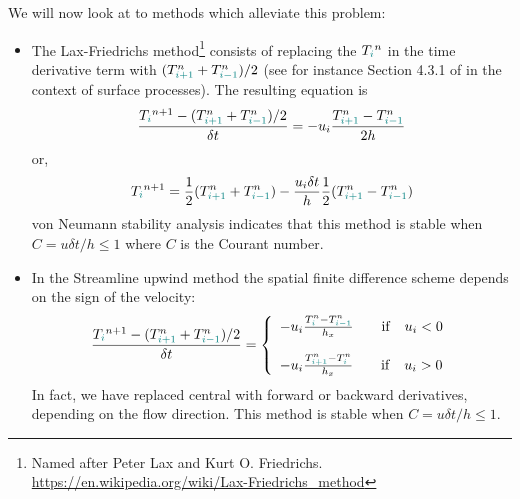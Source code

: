 We will now look at to methods which alleviate this problem:

\begin{itemize}
\item The {\color{olive} Lax-Friedrichs method}\footnote{Named after Peter Lax 
and Kurt O. Friedrichs. \url{https://en.wikipedia.org/wiki/Lax-Friedrichs_method}} consists of replacing the $T_{\color{teal}i}^n$ 
in the time derivative term with $(T_{{\color{teal}i+1}}^n + T_{{\color{teal}i-1}}^n)/2$
(see for instance Section 4.3.1 of \cite{pell08} in the context of surface processes). 
The resulting equation is
\[
\frac{T_{\color{teal}i}^{n+1}-  (T_{{\color{teal}i+1}}^n + T_{{\color{teal}i-1}}^n)/2 }{\delta t} 
= - u_i \frac{T^n_{{\color{teal}i+1}}-T^n_{{\color{teal}i-1}}}{2 h}
\]
or, 
\[
T_{\color{teal}i}^{n+1} = \frac{1}{2} (T_{{\color{teal}i+1}}^n + T_{{\color{teal}i-1}}^n)  
- \frac{u_i \delta t}{h}  \frac{1}{2} (T^n_{{\color{teal}i+1}}-T^n_{{\color{teal}i-1}})
\]
von Neumann stability analysis indicates that this method is stable
when $C=u \delta t/h \leq 1$ where $C$ is the Courant number.
\item In the {\color{olive}Streamline upwind} method the spatial finite difference scheme 
depends on the sign of the velocity:
\[
\frac{T_{\color{teal}i}^{n+1}-  (T_{{\color{teal}i+1}}^n + T_{{\color{teal}i-1}}^n)/2   }{\delta t} =
\left\{
\begin{array}{l}
 - u_i \frac{T^n_{{\color{teal}i}}-T^n_{{\color{teal}i-1}}}{h_x}  \quad\quad  {\rm if} \quad u_i<0\\ \\
 - u_i \frac{T^n_{{\color{teal}i+1}}-T^n_{{\color{teal}i}}}{h_x}  \quad\quad  {\rm if} \quad u_i>0
\end{array}
\right.
\]
In fact, we have replaced central with forward or backward derivatives, depending on the flow direction. 
This method is stable when $C=u \delta t/h \leq 1$. 


\end{itemize}
